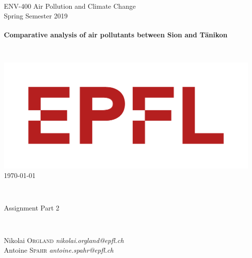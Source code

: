 \documentclass[a4paper, 12pt]{article}
\begin{document}
\thispagestyle{empty}
\begin{center}
    {\large ENV-400 Air Pollution and Climate Change}\\[0.2cm]
    
    {\normalsize Spring Semester 2019 }\\[1.2cm]
    
    \hrulefill 
    \\[0.5cm]
        {\Huge\textbf{Comparative analysis of air pollutants between Sion and Tänikon}}
    \\[0.5cm]
    \hrulefill 	
\end{center}

~\\[1.3cm]

\begin{center}
    \includegraphics[scale=0.20]{Logo_EPFL.png}\\[1.5cm]
    {\large \today}\\[0.5cm]
\end{center}

~\\[2.3cm]

\begin{centering}
    \large
    Assignment Part 2 \\
\end{centering}

~\\[1.3cm]

\begin{centering}
    \large
    Nikolai \textsc{Orgland} \textit{\small nikolai.orgland@epfl.ch}\\ 
    Antoine \textsc{Spahr} \textit{\small antoine.spahr@epfl.ch}\\
\end{centering}

\vfill
\thispagestyle{empty} 
\end{document}

